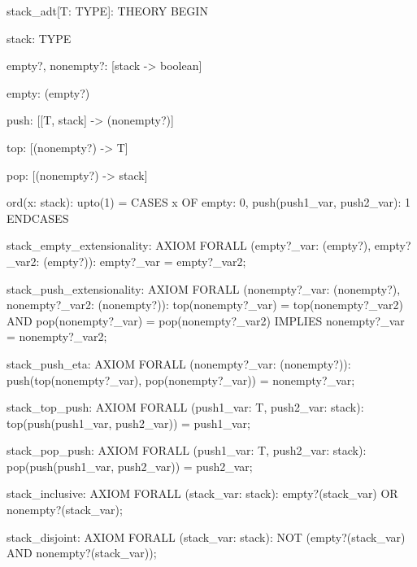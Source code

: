 stack_adt[T: TYPE]: THEORY
  BEGIN
  
  stack: TYPE
  
  empty?, nonempty?: [stack -> boolean]
  
  empty: (empty?)
  
  push: [[T, stack] -> (nonempty?)]
  
  top: [(nonempty?) -> T]
  
  pop: [(nonempty?) -> stack]

  ord(x: stack): upto(1) =
      CASES x OF empty: 0, push(push1_var, push2_var): 1 ENDCASES

  stack_empty_extensionality: AXIOM
    FORALL (empty?_var: (empty?), empty?_var2: (empty?)):
      empty?_var = empty?_var2;

  stack_push_extensionality: AXIOM
    FORALL (nonempty?_var: (nonempty?), nonempty?_var2: (nonempty?)):
      top(nonempty?_var) = top(nonempty?_var2) AND
       pop(nonempty?_var) = pop(nonempty?_var2)
       IMPLIES nonempty?_var = nonempty?_var2;

  stack_push_eta: AXIOM
    FORALL (nonempty?_var: (nonempty?)):
      push(top(nonempty?_var), pop(nonempty?_var)) = nonempty?_var;

  stack_top_push: AXIOM
    FORALL (push1_var: T, push2_var: stack):
      top(push(push1_var, push2_var)) = push1_var;

  stack_pop_push: AXIOM
    FORALL (push1_var: T, push2_var: stack):
      pop(push(push1_var, push2_var)) = push2_var;
  
  stack_inclusive: AXIOM
    FORALL (stack_var: stack): empty?(stack_var) OR nonempty?(stack_var);
  
  stack_disjoint: AXIOM
    FORALL (stack_var: stack):
       NOT (empty?(stack_var) AND nonempty?(stack_var));
